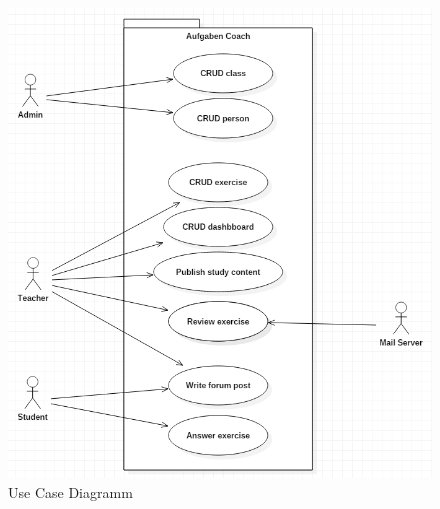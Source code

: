 \begin{minipage}{\textwidth}

\begin{figure}[H]
	\includegraphics[width=\textwidth, height=\textheight, keepaspectratio]{images/UseCaseDiagramm.png}
	\caption{Use Case Diagramm}
	\label{uc_diagram}
\end{figure}

\end{minipage}


